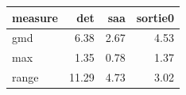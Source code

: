 \begin{tabular}{lrrr}
\toprule
measure & det & saa & sortie0 \\
\midrule
gmd & 6.38 & 2.67 & 4.53 \\
max & 1.35 & 0.78 & 1.37 \\
range & 11.29 & 4.73 & 3.02 \\
\bottomrule
\end{tabular}
